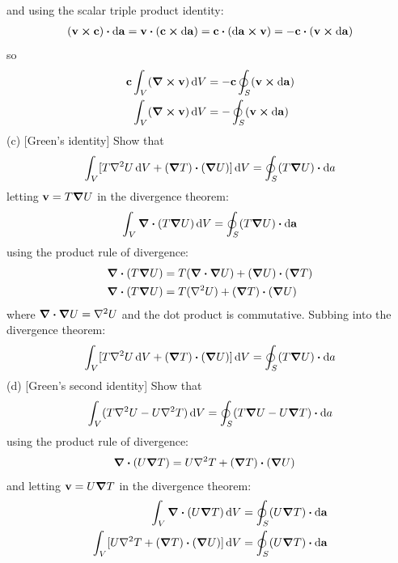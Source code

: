 \documentclass[../main.tex]{subfiles}
\begin{document}
and using the scalar triple product identity:
\begin{align*}
    (\vb{v} \cp \vb{c}) \vdot \dd{\vb{a}} = \vb{v} \vdot (\vb{c} \cp \dd{\vb{a}}) 
    = \vb{c} \vdot (\dd{\vb{a}} \cp \vb{v}) = -\vb{c} \vdot (\vb{v} \cp \dd{\vb{a}})
\end{align*}
so
\begin{align*}
    \vb{c} \int_V (\curl \vb{v}) \dd{V} &= -\vb{c} \oint_S (\vb{v} \cp \dd{\vb{a}}) \\
    \int_V (\curl \vb{v}) \dd{V} &= -\oint_S (\vb{v} \cp \dd{\vb{a}})
\end{align*}
(c) [Green's identity] Show that
\begin{align*}
    \int_V [T\laplacian U \dd{V} + (\grad T) \vdot (\grad U)] \dd{V}
    = \oint_S (T \grad U) \vdot \dd{a}
\end{align*}
letting $\vb{v} = T \grad U$ in the divergence theorem:
\begin{align*}
    \int_V \div(T \grad U) \dd{V} = \oint_S (T \grad U) \vdot \dd{\vb{a}}
\end{align*}
using the product rule of divergence:
\begin{align*}
    \div(T \grad U) &= T (\div \grad U) + (\grad U) \vdot (\grad T) \\
    \div(T \grad U) &= T (\laplacian U) + (\grad T) \vdot (\grad U)
\end{align*}
where $\div \grad U = \laplacian U$ and the dot product is commutative. Subbing into the divergence
theorem:
\begin{align*}
    \int_V [T\laplacian U \dd{V} + (\grad T) \vdot (\grad U)] \dd{V}
    = \oint_S (T \grad U) \vdot \dd{a}
\end{align*}
(d) [Green's second identity] Show that
\begin{align*}
    \int_V (T \laplacian U - U \laplacian T) \dd{V} = \oint_S (T \grad U - U \grad T) \vdot \dd{a}
\end{align*}
using the product rule of divergence:
\begin{align*}
    \div(U \grad T) &= U \laplacian T + (\grad T) \vdot (\grad U) 
\end{align*}
and letting $\vb{v} = U \grad T$ in the divergence theorem:
\begin{align*}
    \int_V \div(U \grad T) \dd{V} &= \oint_S (U \grad T) \vdot \dd{\vb{a}} \\
    \int_V [U\laplacian T  + (\grad T) \vdot (\grad U)] \dd{V}
        &= \oint_S (U \grad T) \vdot \dd{\vb{a}}
\end{align*}
\end{document}
